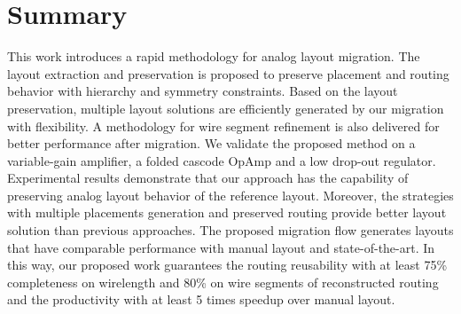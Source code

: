   \section{Summary}\label{sec:RLPADMSum}

    This work introduces a rapid methodology for analog layout migration. The layout extraction and preservation is proposed to preserve placement and routing behavior with hierarchy and symmetry constraints. Based on the layout preservation, multiple layout solutions are efficiently generated by our migration with flexibility. A methodology for wire segment refinement is also delivered for better performance after migration.
    We validate the proposed method on a variable-gain amplifier, a folded cascode OpAmp and a low drop-out regulator.
    Experimental results demonstrate that our approach has the capability of preserving analog layout behavior of the reference layout. Moreover, the strategies with multiple placements generation and preserved routing provide better layout solution than previous approaches. The proposed migration flow generates layouts that have comparable performance with manual layout and state-of-the-art. In this way, our proposed work guarantees the routing reusability with at least 75\% completeness on wirelength and 80\% on wire segments of reconstructed routing and the productivity with at least 5 times speedup over manual layout.